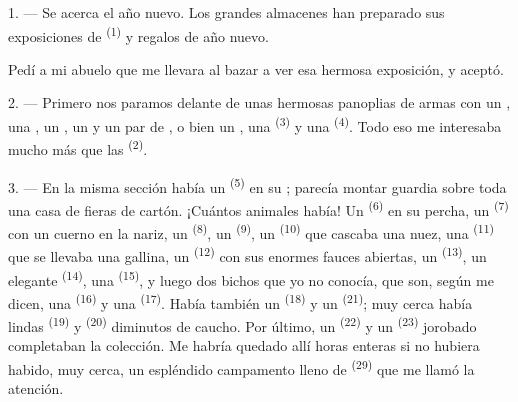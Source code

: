 %

\VUsaut{4.0mm}
\VUsaut{2.0mm}
\VUsaut{3.4mm}

1. --- Se acerca el año nuevo. Los grandes almacenes han preparado sus
exposiciones de  \textsuperscript{(1)} y regalos de año nuevo.

Pedí a mi abuelo que me llevara al bazar a ver esa hermosa exposición, y
aceptó.

2. --- Primero nos paramos delante de unas hermosas panoplias de armas con
un , una , un , un
 y un par de , o bien un ,
una  \textsuperscript{(3)} y una  \textsuperscript{(4)}. Todo
eso
me interesaba mucho más que las  \textsuperscript{(2)}.

\VUsaut{3.0mm}
\VUsaut{2.6mm}

3. --- En la misma sección había un  \textsuperscript{(5)} en su
; parecía montar guardia sobre toda una casa de fieras de
cartón. ¡Cuántos animales había! Un  \textsuperscript{(6)} en su percha,
un  \textsuperscript{(7)} con un cuerno en la nariz, un
 \textsuperscript{(8)}, un  \textsuperscript{(9)}, un
 \textsuperscript{(10)} que cascaba una nuez, una 
\textsuperscript{(11)} que se llevaba una gallina, un 
\textsuperscript{(12)} con sus enormes fauces abiertas, un 
\textsuperscript{(13)}, un elegante  \textsuperscript{(14)}, una
 \textsuperscript{(15)}, y luego dos bichos que yo no conocía, que
son, según me dicen, una  \textsuperscript{(16)} y una
 \textsuperscript{(17)}. Había también un 
\textsuperscript{(18)} y un  \textsuperscript{(21)}; muy cerca había lindas
 \textsuperscript{(19)} y  \textsuperscript{(20)} diminutos de
caucho. Por último, un  \textsuperscript{(22)} y un
 \textsuperscript{(23)} jorobado completaban la colección. Me
habría quedado allí horas enteras si no hubiera habido, muy cerca, un
espléndido campamento lleno de  \textsuperscript{(29)}
que me llamó la atención.

